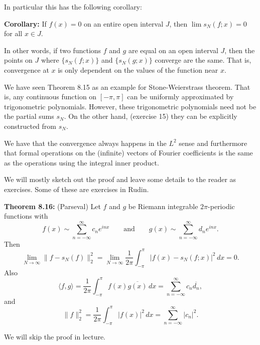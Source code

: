 \documentclass[12pt]{book}
\newcommand{\snorm}[1]{\lVert {#1} \rVert}
\newcommand{\abs}[1]{\left\lvert {#1} \right\rvert}
\theoremstyle{plain}
\theoremstyle{remark}
\theoremstyle{definition}
\theoremstyle{exercise}
\theoremstyle{example}
\begin{document}
\medskip

In particular this has the following corollary:

\medskip

\textbf{Corollary:}
If $f(x) = 0$ on an entire open interval $J$, then $\lim s_N(f;x) = 0$
for all $x \in J$.

\medskip

In other words, if two functions $f$ and $g$
are equal on an open interval $J$, then the
points on $J$ where $\{ s_N(f;x) \}$ and $\{ s_N(g;x) \}$ converge are the same.  That is,
convergence at $x$ is only dependent on the values of the function
near $x$.

\medskip

We have seen Theorem 8.15 as an example for Stone-Weierstrass theorem.
That is, any continuous function on $[-\pi,\pi]$ can be uniformly approximated
by trigonometric polynomials.  However, these trigonometric polynomials need
not be the partial sums $s_N$.  On the other hand, (exercise 15) they can be
explicitly constructed from $s_N$.

\medskip

We have that the convergence always happens in the $L^2$ sense and
furthermore that formal operations on the (infinite) vectors of
Fourier coefficients is the same as the operations using the integral
inner product.

\medskip

We will mostly sketch out the proof and leave some details to the reader
as exercises.  Some of these are exercises in Rudin.


\medskip

\textbf{Theorem 8.16:} (Parseval)
Let $f$ and $g$ be Riemann integrable $2\pi$-periodic functions
with
$$
f(x) \sim
\sum_{n=-\infty}^\infty c_n e^{inx}
\qquad \text{and} \qquad
g(x) \sim
\sum_{n=-\infty}^\infty d_n e^{inx} .
$$
Then
$$
\lim_{N\to\infty} \snorm{f-s_N(f)}_2^2 = 
\lim_{N\to\infty}
\frac{1}{2\pi}
\int_{-\pi}^\pi
\abs{f(x)-s_N(f;x)}^2 \, dx
=0 .
$$
Also
$$
\langle f , g \rangle =
\frac{1}{2\pi}
\int_{-\pi}^\pi
f(x) \overline{g(x)}\, dx
=
\sum_{n=-\infty}^\infty c_n \overline{d_n} ,
$$
and
$$
\snorm{f}_2^2
=
\frac{1}{2\pi}
\int_{-\pi}^\pi
\abs{f(x)}^2 \, dx
=
\sum_{n=-\infty}^\infty \abs{c_n}^2.
$$

\medskip

We will skip the proof in lecture.
\end{document}
